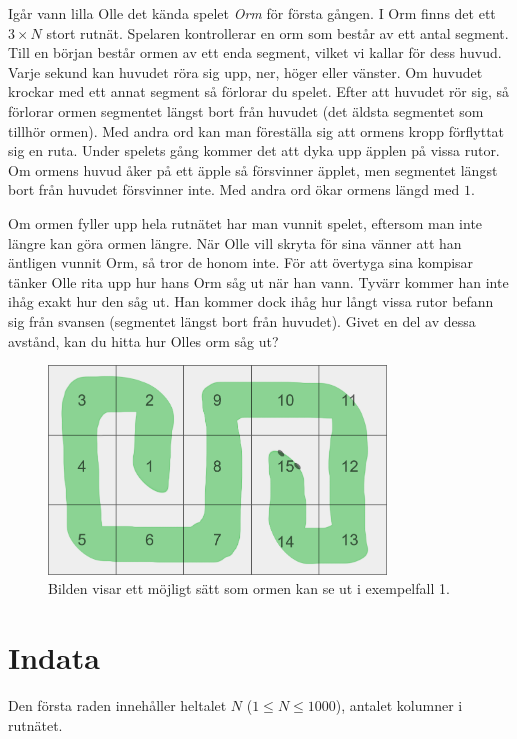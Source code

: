 \noindent

Igår vann lilla Olle det kända spelet \textit{Orm} för första gången. I Orm finns det ett $3 \times N$ stort rutnät. 
Spelaren kontrollerar en orm som består av ett antal segment. Till en början består ormen av ett enda segment, vilket vi
kallar för dess huvud. Varje sekund kan huvudet röra sig upp, ner, höger eller vänster. Om huvudet krockar med ett annat segment
så förlorar du spelet. Efter att huvudet rör sig, så förlorar ormen segmentet längst bort från huvudet (det äldsta segmentet som
tillhör ormen). Med andra ord kan man
föreställa sig att ormens kropp förflyttat sig en ruta. Under spelets gång kommer det att dyka upp äpplen på vissa rutor.
Om ormens huvud åker på ett äpple så försvinner äpplet, men segmentet längst bort från huvudet försvinner inte. Med andra ord
ökar ormens längd med $1$.

Om ormen fyller upp hela rutnätet har man vunnit spelet, eftersom man inte längre kan göra ormen längre. När Olle vill skryta för
sina vänner att han äntligen vunnit Orm, så tror de honom inte. För att övertyga sina kompisar tänker Olle rita upp hur hans Orm
såg ut när han vann. Tyvärr kommer han inte ihåg exakt hur den såg ut. Han kommer dock ihåg hur långt vissa rutor befann sig från
svansen (segmentet längst bort från huvudet). Givet en del av dessa avstånd, kan du hitta hur Olles orm såg ut?

\begin{centering}
  \begin{figure}[h]
      \centering
      \includegraphics[width=0.8\textwidth]{snake.png}
      \caption{Bilden visar ett möjligt sätt som ormen kan se ut i exempelfall 1.}
  \end{figure}
\end{centering}

\section*{Indata}
Den första raden innehåller heltalet $N$ ($1 \leq N \leq 1000$), antalet kolumner i rutnätet.

